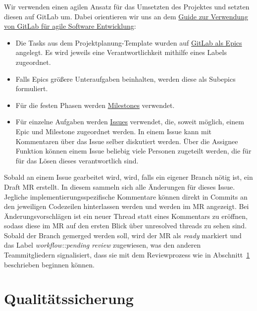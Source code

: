 Wir verwenden einen agilen Ansatz für das Umsetzten des Projektes und setzten diesen auf GitLab um.
Dabei orientieren wir uns an dem
\href{https://about.gitlab.com/blog/2018/03/05/gitlab-for-agile-software-development/}{Guide
zur Verwendung von GitLab für agile Software Entwicklung}:
\begin{itemize}
    \item Die Tasks aus dem Projektplanung-Template wurden auf
    \href{https://git.haw-hamburg.de/groups/ss21-esep-gruppe-2.3/-/epics}{GitLab als Epics} angelegt.
    Es wird jeweils eine Verantwortlichkeit mithilfe eines Labels zugeordnet.
    \item Falls Epics größere Unteraufgaben beinhalten, werden diese als Subepics formuliert.
    \item Für die festen Phasen werden
    \href{https://git.haw-hamburg.de/groups/ss21-esep-gruppe-2.3/-/milestones}{Milestones} verwendet.
    \item Für einzelne Aufgaben werden
    \href{https://git.haw-hamburg.de/groups/ss21-esep-gruppe-2.3/-/issues}{Issues}
    verwendet, die, soweit möglich, einem Epic und Milestone zugeordnet werden.
    In einem Issue kann mit Kommentaren über das Issue selber diskutiert werden.
    Über die Assignee Funktion können einem Issue beliebig viele Personen zugeteilt werden, die für
    für das Lösen dieses verantwortlich sind.
\end{itemize}
Sobald an einem Issue gearbeitet wird, wird, falls ein eigener Branch nötig ist, ein Draft MR
erstellt.
In diesem sammeln sich alle Änderungen für dieses Issue.
Jegliche implementierungsspezifische Kommentare können direkt in Commits an den jeweiligen
Codezeilen hinterlassen werden und werden im MR angezeigt.
Bei Änderungsvorschlägen ist ein neuer Thread statt eines Kommentars zu eröffnen, sodass diese im MR
auf den ersten Blick über \glqq unresolved threads\grqq{} zu sehen sind.
Sobald der Branch gemerged werden soll, wird der MR als \textit{ready} markiert und das Label
\textit{workflow::pending review} zugewiesen, was den anderen
Teammitgliedern signalisiert, dass sie mit dem Reviewprozess wie in
Abschnitt~\ref{sec:qualitaetssicherung} beschrieben beginnen können.


\section{Qualitätssicherung}\label{sec:qualitaetssicherung}

